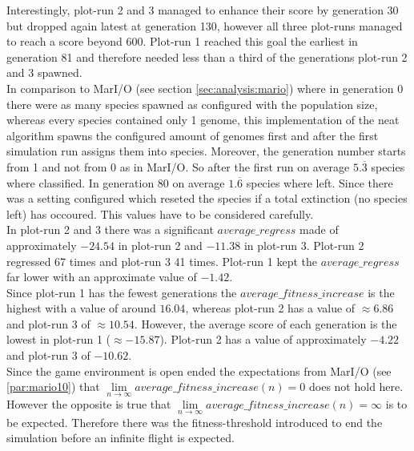 			Interestingly, plot-run 2 and 3 managed to enhance their score by generation 30 but dropped again latest at generation 130, however all three plot-runs managed to reach a score beyond 600. Plot-run 1 reached this goal the earliest in generation 81 and therefore needed less than a third of the generations plot-run 2 and 3 spawned.\\
			In comparison to MarI/O (see section \ref{sec:analysis:mario}) where in generation 0 there were as many species spawned as configured with the population size, whereas every species contained only 1 genome, this implementation of the \gls{neat} algorithm spawns the configured amount of genomes first and after the first simulation run assigns them into species. Moreover, the generation number starts from 1 and not from 0 as in MarI/O. So after the first run on average $5.\overline{3}$ species where classified. In generation 80 on average $1.\overline{6}$ species where left. Since there was a setting configured which reseted the species if a total extinction (no species left) has occoured. This values have to be considered carefully.\\
			In plot-run 2 and 3 there was a significant $average\_regress$ made of approximately $-24.54$ in plot-run 2 and $-11.38$ in plot-run 3. Plot-run 2 regressed 67 times and plot-run 3 41 times. Plot-run 1 kept the $average\_regress$ far lower with an approximate value of $-1.42$.\\
			Since plot-run 1 has the fewest generations the $average\_fitness\_increase$ is the highest with a value of around $16.04$, whereas plot-run 2 has a value of $\approx6.86$ and plot-run 3 of $\approx10.54$. However, the average score of each generation is the lowest in plot-run 1 ($\approx-15.87$). Plot-run 2 has a value of approximately $-4.22$ and plot-run 3 of $-10.62$. \\
			Since the game environment is open ended the expectations from MarI/O (see \ref{par:mario10}) that $\lim\limits_{n \to \infty} average\_fitness\_increase(n) = 0$ does not hold here. However the opposite is true that $\lim\limits_{n \to \infty} average\_fitness\_increase(n) = \infty$ is to be expected. Therefore there was the fitness-threshold introduced to end the simulation before an infinite flight is expected.
		
